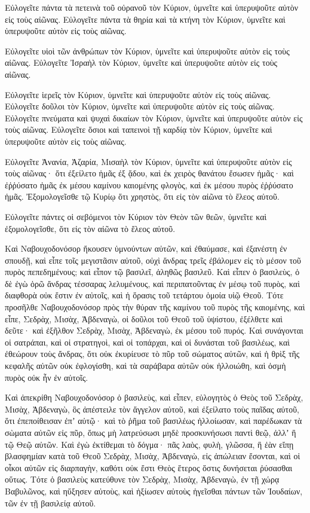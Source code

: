 {Εὐλογεῖτε πάντα τὰ πετεινὰ τοῦ οὐρανοῦ τὸν Κύριον, ὑμνεῖτε καὶ ὑπερυψοῦτε αὐτὸν εἰς τοὺς αἰῶνας.
Εὐλογεῖτε πάντα τὰ θηρία καὶ τὰ κτήνη τὸν Κύριον, ὑμνεῖτε καὶ ὑπερυψοῦτε αὐτὸν εἰς τοὺς αἰῶνας.
\par }{\PP {}Εὐλογεῖτε υἱοὶ τῶν ἀνθρώπων τὸν Κύριον, ὑμνεῖτε καὶ ὑπερυψοῦτε αὐτὸν εἰς τοὺς αἰῶνας.
Εὐλογεῖτε Ἰσραὴλ τὸν Κύριον, ὑμνεῖτε καὶ ὑπερυψοῦτε αὐτὸν εἰς τοὺς αἰῶνας.
\par }{\PP {}Εὐλογεῖτε ἱερεῖς τὸν Κύριον, ὑμνεῖτε καὶ ὑπερυψοῦτε αὐτὸν εἰς τοὺς αἰῶνας.
Εὐλογεῖτε δοῦλοι τὸν Κύριον, ὑμνεῖτε καὶ ὑπερυψοῦτε αὐτὸν εἰς τοὺς αἰῶνας.
Εὐλογεῖτε πνεύματα καὶ ψυχαὶ δικαίων τὸν Κύριον, ὑμνεῖτε καὶ ὑπερυψοῦτε αὐτὸν εἰς τοὺς αἰῶνας.
Εὐλογεῖτε ὅσιοι καὶ ταπεινοὶ τῇ καρδίᾳ τὸν Κύριον, ὑμνεῖτε καὶ ὑπερυψοῦτε αὐτὸν εἰς τοὺς αἰῶνας.
\par }{\PP {}Εὐλογεῖτε Ἀνανία, Ἀζαρία, Μισαὴλ τὸν Κύριον, ὑμνεῖτε καὶ ὑπερυψοῦτε αὐτὸν εἰς τοὺς αἰῶνας· ὅτι ἐξείλετο ἡμᾶς ἐξ ᾅδου, καὶ ἐκ χειρὸς θανάτου ἔσωσεν ἡμᾶς· καὶ ἐῤῥύσατο ἡμᾶς ἐκ μέσου καμίνου καιομένης φλογὸς, καὶ ἐκ μέσου πυρὸς ἐῤῥύσατο ἡμᾶς.
Ἐξομολογεῖσθε τῷ Κυρίῳ ὅτι χρηστὸς, ὅτι εἰς τὸν αἰῶνα τὸ ἔλεος αὐτοῦ.
\par }{\PP {}Εὐλογεῖτε πάντες οἱ σεβόμενοι τὸν Κύριον τὸν Θεὸν τῶν θεῶν, ὑμνεῖτε καὶ ἐξομολογεῖσθε, ὅτι εἰς τὸν αἰῶνα τὸ ἔλεος αὐτοῦ.
\par }{\PP {}Καὶ Ναβουχοδονόσορ ἤκουσεν ὑμνούντων αὐτῶν, καὶ ἐθαύμασε, καὶ ἐξανέστη ἐν σπουδῇ, καὶ εἶπε τοῖς μεγιστᾶσιν αὐτοῦ, οὐχὶ ἄνδρας τρεῖς ἐβάλομεν εἰς τὸ μέσον τοῦ πυρὸς πεπεδημένους; καὶ εἶπον τῷ βασιλεῖ, ἀληθῶς βασιλεῦ.
Καὶ εἶπεν ὁ βασιλεὺς, ὁ δὲ ἐγὼ ὁρῶ ἄνδρας τέσσαρας λελυμένους, καὶ περιπατοῦντας ἐν μέσῳ τοῦ πυρὸς, καὶ διαφθορὰ οὐκ ἔστιν ἐν αὐτοῖς, καὶ ἡ ὅρασις τοῦ τετάρτου ὁμοία υἱῷ Θεοῦ.
Τότε προσῆλθε Ναβουχοδονόσορ πρὸς τὴν θύραν τῆς καμίνου τοῦ πυρὸς τῆς καιομένης, καὶ εἶπε, Σεδρὰχ, Μισὰχ, Ἀβδεναγὼ, οἱ δοῦλοι τοῦ Θεοῦ τοῦ ὑψίστου, ἐξέλθετε καὶ δεῦτε· καὶ ἐξῆλθον Σεδρὰχ, Μισὰχ, Ἀβδεναγὼ, ἐκ μέσου τοῦ πυρός.
Καὶ συνάγονται οἱ σατράπαι, καὶ οἱ στρατηγοὶ, καὶ οἱ τοπάρχαι, καὶ οἱ δυνάσται τοῦ βασιλέως, καὶ ἐθεώρουν τοὺς ἄνδρας, ὅτι οὐκ ἐκυρίευσε τὸ πῦρ τοῦ σώματος αὐτῶν, καὶ ἡ θρὶξ τῆς κεφαλῆς αὐτῶν οὐκ ἐφλογίσθη, καὶ τὰ σαράβαρα αὐτῶν οὐκ ἠλλοιώθη, καὶ ὀσμὴ πυρὸς οὐκ ἦν ἐν αὐτοῖς.
\par }{\PP {}Καὶ ἀπεκρίθη Ναβουχοδονόσορ ὁ βασιλεὺς, καὶ εἶπεν, εὐλογητὸς ὁ Θεὸς τοῦ Σεδρὰχ, Μισὰχ, Ἀβδεναγὼ, ὃς ἀπέστειλε τὸν ἄγγελον αὐτοῦ, καὶ ἐξείλατο τοὺς παῖδας αὐτοῦ, ὅτι ἐπεποίθεισαν ἐπʼ αὐτῷ· καὶ τὸ ῥῆμα τοῦ βασιλέως ἠλλοίωσαν, καὶ παρέδωκαν τὰ σὼματα αὐτῶν εἰς πῦρ, ὅπως μὴ λατρεύσωσι μηδὲ προσκυνήσωσι παντὶ θεῷ, ἀλλʼ ἢ τῷ Θεῷ αὐτῶν.
Καὶ ἐγὼ ἐκτίθεμαι τὸ δόγμα· πᾶς λαὸς, φυλὴ, γλῶσσα, ἣ ἐὰν εἴπῃ βλασφημίαν κατὰ τοῦ Θεοῦ Σεδρὰχ, Μισὰχ, Ἀβδεναγὼ, εἰς ἀπώλειαν ἔσονται, καὶ οἱ οἶκοι αὐτῶν εἰς διαρπαγὴν, καθότι οὐκ ἔστι Θεὸς ἕτερος ὅστις δυνήσεται ῥύσασθαι οὕτως.
Τότε ὁ βασιλεὺς κατεύθυνε τὸν Σεδρὰχ, Μισὰχ, Ἀβδεναγὼ, ἐν τῇ χώρᾳ Βαβυλῶνος, καὶ ηὔξησεν αὐτοὺς, καὶ ἠξίωσεν αὐτοὺς ἡγεῖσθαι πάντων τῶν Ἰουδαίων, τῶν ἐν τῇ βασιλείᾳ αὐτοῦ.

}

